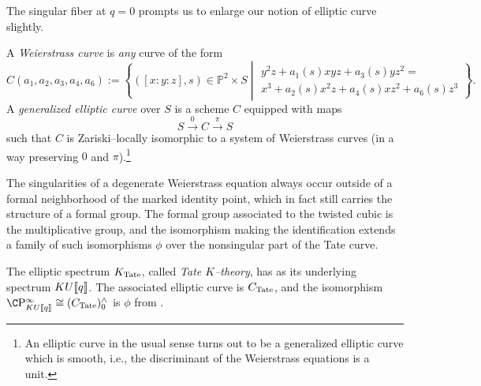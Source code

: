 The singular fiber at $q = 0$ prompts us to enlarge our notion of elliptic curve slightly.

\begin{definition}
A \textit{Weierstrass curve} is \emph{any} curve of the form \[C(a_1, a_2, a_3, a_4, a_6) := \left\{ ([x : y : z], s) \in \mathbb P^2 \times S \middle| \begin{array}{c} y^2 z + a_1(s) xyz + a_3(s) yz^2 = \\ x^3 + a_2(s) x^2 z + a_4(s) x z^2 + a_6(s) z^3 \end{array} \right\}.\]  A \textit{generalized elliptic curve} over $S$ is a scheme $C$ equipped with maps \[S \xrightarrow{0} C \xrightarrow{\pi} S\] such that $C$ is Zariski--locally isomorphic to a system of Weierstrass curves (in a way preserving $0$ and $\pi$).\footnote{An elliptic curve in the usual sense turns out to be a generalized elliptic curve which is smooth, i.e., the discriminant of the Weierstrass equations is a unit.}
\end{definition}

\begin{remark}\label{TwistedCubicGivesGm}
The singularities of a degenerate Weierstrass equation always occur outside of a formal neighborhood of the marked identity point, which in fact still carries the structure of a formal group.  The formal group associated to the twisted cubic is the multiplicative group, and the isomorphism making the identification extends a family of such isomorphisms $\phi$ over the nonsingular part of the Tate curve.
\end{remark}

\begin{definition}
The elliptic spectrum $K_{\mathrm{Tate}}$, called \textit{Tate $K$--theory}, has as its underlying spectrum $KU\llbracket{q}\rrbracket$.  The associated elliptic curve is $C_{\mathrm{Tate}}$, and the isomorphism $\CP^\infty_{KU\ps{q}} \cong (C_{\Tate})^\wedge_0$ is $\phi$ from .
\end{definition}

